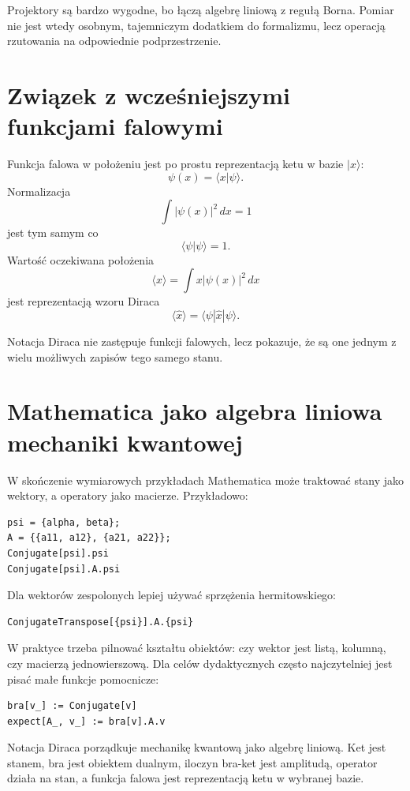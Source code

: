 Projektory są bardzo wygodne, bo łączą algebrę liniową z regułą Borna. Pomiar nie jest wtedy osobnym, tajemniczym dodatkiem do formalizmu, lecz operacją rzutowania na odpowiednie podprzestrzenie.

\section{Związek z wcześniejszymi funkcjami falowymi}

Funkcja falowa w położeniu jest po prostu reprezentacją ketu w bazie \(|x\rangle\):
\begin{equation}
    \psi(x)=\langle x|\psi\rangle.
\end{equation}
Normalizacja
\begin{equation}
    \int |\psi(x)|^2\,dx=1
\end{equation}
jest tym samym co
\begin{equation}
    \langle\psi|\psi\rangle=1.
\end{equation}
Wartość oczekiwana położenia
\begin{equation}
    \langle x\rangle=\int x|\psi(x)|^2\,dx
\end{equation}
jest reprezentacją wzoru Diraca
\begin{equation}
    \langle\hat{x}\rangle=\langle\psi|\hat{x}|\psi\rangle.
\end{equation}

Notacja Diraca nie zastępuje funkcji falowych, lecz pokazuje, że są one jednym z wielu możliwych zapisów tego samego stanu.

\section{Mathematica jako algebra liniowa mechaniki kwantowej}

W skończenie wymiarowych przykładach Mathematica może traktować stany jako wektory, a operatory jako macierze. Przykładowo:
\begin{verbatim}
psi = {alpha, beta};
A = {{a11, a12}, {a21, a22}};
Conjugate[psi].psi
Conjugate[psi].A.psi
\end{verbatim}
Dla wektorów zespolonych lepiej używać sprzężenia hermitowskiego:
\begin{verbatim}
ConjugateTranspose[{psi}].A.{psi}
\end{verbatim}
W praktyce trzeba pilnować kształtu obiektów: czy wektor jest listą, kolumną, czy macierzą jednowierszową. Dla celów dydaktycznych często najczytelniej jest pisać małe funkcje pomocnicze:
\begin{verbatim}
bra[v_] := Conjugate[v]
expect[A_, v_] := bra[v].A.v
\end{verbatim}

\begin{summarybox}
Notacja Diraca porządkuje mechanikę kwantową jako algebrę liniową. Ket jest stanem, bra jest obiektem dualnym, iloczyn bra-ket jest amplitudą, operator działa na stan, a funkcja falowa jest reprezentacją ketu w wybranej bazie.
\end{summarybox}
